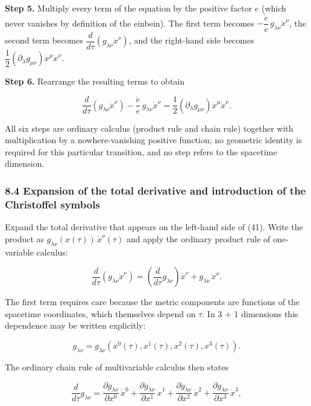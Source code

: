 \documentclass[
]{article}
\begin{document}
\textbf{Step 5.} Multiply every term of the equation by the positive
factor \(e\) (which never vanishes by definition of the einbein). The
first term becomes
\(- \dfrac{\dot{e}}{e}\, g_{\lambda\nu} \dot{x}^{\nu}\), the second term
becomes
\(\dfrac{d}{d\tau} \left( g_{\lambda\nu} \dot{x}^{\nu} \right)\), and
the right-hand side becomes
\(\dfrac{1}{2} \left( \partial_{\lambda} g_{\mu\nu} \right) \dot{x}^{\mu} \dot{x}^{\nu}\).

\textbf{Step 6.} Rearrange the resulting terms to obtain

\[\frac{d}{d\tau} \left( g_{\lambda\nu} \dot{x}^{\nu} \right) - \frac{\dot{e}}{e}\, g_{\lambda\nu} \dot{x}^{\nu} = \frac{1}{2} \left( \partial_{\lambda} g_{\mu\nu} \right) \dot{x}^{\mu} \dot{x}^{\nu}. \tag{41}\]

All six steps are ordinary calculus (product rule and chain rule)
together with multiplication by a nowhere-vanishing positive function;
no geometric identity is required for this particular transition, and no
step refers to the spacetime dimension.

\hypertarget{expansion-of-the-total-derivative-and-introduction-of-the-christoffel-symbols}{%
\subsubsection{8.4 Expansion of the total derivative and introduction of
the Christoffel
symbols}\label{expansion-of-the-total-derivative-and-introduction-of-the-christoffel-symbols}}

Expand the total derivative that appears on the left-hand side of (41).
Write the product as \(g_{\lambda\nu}(x(\tau))\, \dot{x}^{\nu}(\tau)\)
and apply the ordinary product rule of one-variable calculus:

\[\frac{d}{d\tau} \left( g_{\lambda\nu} \dot{x}^{\nu} \right) = \left( \frac{d}{d\tau} g_{\lambda\nu} \right) \dot{x}^{\nu} + g_{\lambda\nu}\, \ddot{x}^{\nu}. \tag{42}\]

The first term requires care because the metric components are functions
of the spacetime coordinates, which themselves depend on \(\tau\). In 3
+ 1 dimensions this dependence may be written explicitly:

\[g_{\lambda\nu} = g_{\lambda\nu}\left( x^{0}(\tau), x^{1}(\tau), x^{2}(\tau), x^{3}(\tau) \right).\]

The ordinary chain rule of multivariable calculus then states

\[\frac{d}{d\tau} g_{\lambda\nu} = \frac{\partial g_{\lambda\nu}}{\partial x^{0}}\, \dot{x}^{0} + \frac{\partial g_{\lambda\nu}}{\partial x^{1}}\, \dot{x}^{1} + \frac{\partial g_{\lambda\nu}}{\partial x^{2}}\, \dot{x}^{2} + \frac{\partial g_{\lambda\nu}}{\partial x^{3}}\, \dot{x}^{3}, \tag{43}\]
\end{document}

